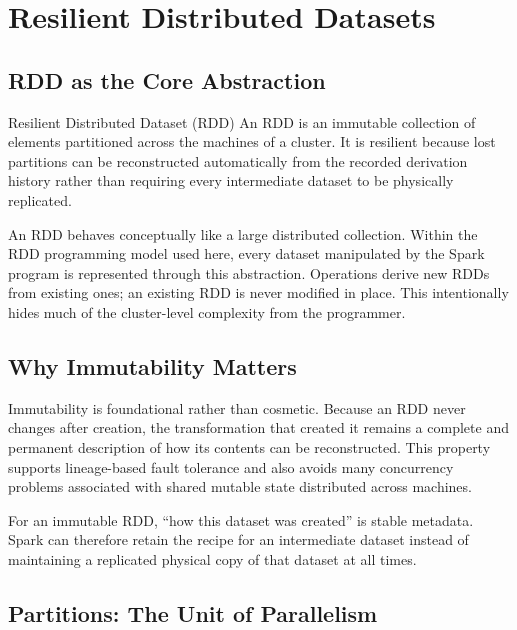\documentclass[11pt,a4paper,oneside]{book}
\begin{document}
\section{Resilient Distributed Datasets}
\label{sec:rdds}

\subsection{RDD as the Core Abstraction}

\begin{definitionbox}{Resilient Distributed Dataset (RDD)}
An RDD is an immutable collection of elements partitioned across the machines of a cluster. It is resilient because lost partitions can be reconstructed automatically from the recorded derivation history rather than requiring every intermediate dataset to be physically replicated.
\end{definitionbox}

An RDD behaves conceptually like a large distributed collection. Within the RDD programming model used here, every dataset manipulated by the Spark program is represented through this abstraction. Operations derive new RDDs from existing ones; an existing RDD is never modified in place. This intentionally hides much of the cluster-level complexity from the programmer.

\subsection{Why Immutability Matters}

Immutability is foundational rather than cosmetic. Because an RDD never changes after creation, the transformation that created it remains a complete and permanent description of how its contents can be reconstructed. This property supports lineage-based fault tolerance and also avoids many concurrency problems associated with shared mutable state distributed across machines.

\begin{keyconcept}
For an immutable RDD, ``how this dataset was created'' is stable metadata. Spark can therefore retain the recipe for an intermediate dataset instead of maintaining a replicated physical copy of that dataset at all times.
\end{keyconcept}

\subsection{Partitions: The Unit of Parallelism}
\end{document}
